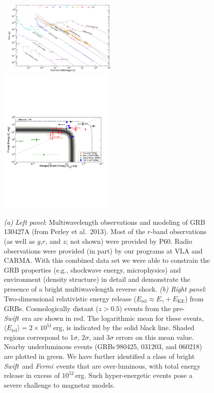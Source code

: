 \documentclass[letterpaper,11pt]{article}
\newcommand{\swift}{\textit{Swift}}
\newcommand{\fermi}{\textit{Fermi}}
\begin{document}
\begin{figure}[htp!]
\begin{center}
\hbox{
 \includegraphics[width=0.5\textwidth]{130427a.pdf}
 \hspace{0.5cm}
 \includegraphics[width=0.5\textwidth]{waterfall_lat.pdf}
 }
\end{center}
\caption{\footnotesize
{{\it (a) Left panel}:  Multiwavelength observations and modeling of GRB 130427A (from Perley et al.\ 2013).  
Most of the $r$-band observations (as well as $g$,$r$, and $z$; not shown) were provided by P60.  Radio observations were provided (in part) by our programs at VLA and CARMA.  With this combined data set we were able to constrain the GRB properties (e.g., shockwave energy, microphysics) and environment (density structure) in detail and demonstrate the presence of a bright multiwavelength reverse shock.
{\it (b) Right panel}: Two-dimensional relativistic energy release ($E_{\mathrm{rel}} \approx
E_{\gamma} + E_{\mathrm{KE}}$) from GRBs.  Cosmologically distant ($z > 0.5$)
events from the pre-\swift\ era are shown in red.  The logarithmic mean
for these events, $\langle E_{\mathrm{rel}} \rangle = 2 \times 10^{51}$\,erg, is 
indicated by the solid black line.  Shaded regions correspond to 1$\sigma$, 2$\sigma$,
and 3$\sigma$ errors on this mean value.  Nearby underluminous events (GRBs\,980425, 031203,
and 060218) are plotted in green.  We have further identified a class of bright \swift\ and \fermi\
events that are over-luminous, with total energy release in excess of $10^{52}$\,erg.  Such
hyper-energetic events pose a severe challenge to magnetar models.}}
\label{fig1}
\end{figure}
\end{document}
